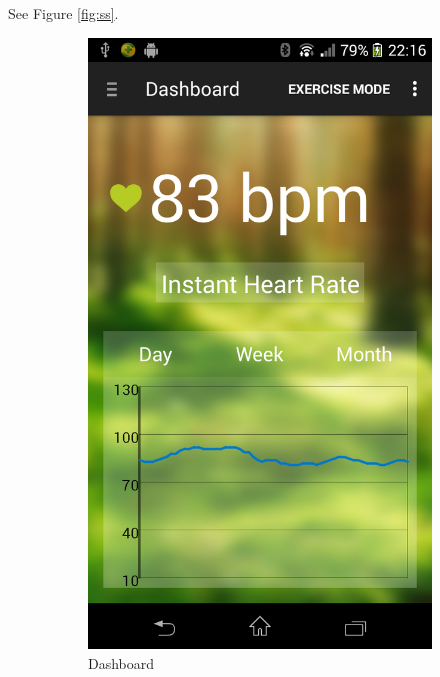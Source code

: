 See Figure \ref{fig:ss}.
\begin{figure}
\centering
\begin{subfigure}{.24\textwidth}
  \centering
  \includegraphics[width=.8\linewidth]{img/screenshot/ss1.png}
  \caption{Dashboard}
\end{subfigure}%
\begin{subfigure}{.24\textwidth}
  \centering

\end{subfigure}
\end{figure}
